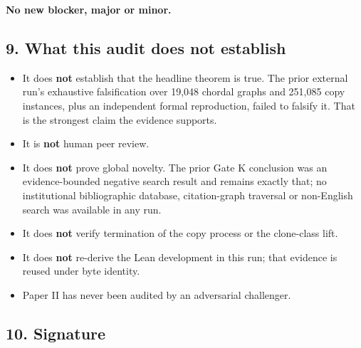 \documentclass[
  10pt,
]{article}
\providecommand{\tightlist}{%
  \setlength{\itemsep}{0pt}\setlength{\parskip}{0pt}}
\begin{document}
\textbf{No new blocker, major or minor.}

\subsection{9. What this audit does not
establish}\label{what-this-audit-does-not-establish}

\begin{itemize}
\tightlist
\item
  It does \textbf{not} establish that the headline theorem is true. The
  prior external run's exhaustive falsification over 19,048 chordal
  graphs and 251,085 copy instances, plus an independent formal
  reproduction, failed to falsify it. That is the strongest claim the
  evidence supports.
\item
  It is \textbf{not} human peer review.
\item
  It does \textbf{not} prove global novelty. The prior Gate K conclusion
  was an evidence-bounded negative search result and remains exactly
  that; no institutional bibliographic database, citation-graph
  traversal or non-English search was available in any run.
\item
  It does \textbf{not} verify termination of the copy process or the
  clone-class lift.
\item
  It does \textbf{not} re-derive the Lean development in this run; that
  evidence is reused under byte identity.
\item
  Paper II has never been audited by an adversarial challenger.
\end{itemize}

\subsection{10. Signature}\label{signature}
\end{document}
